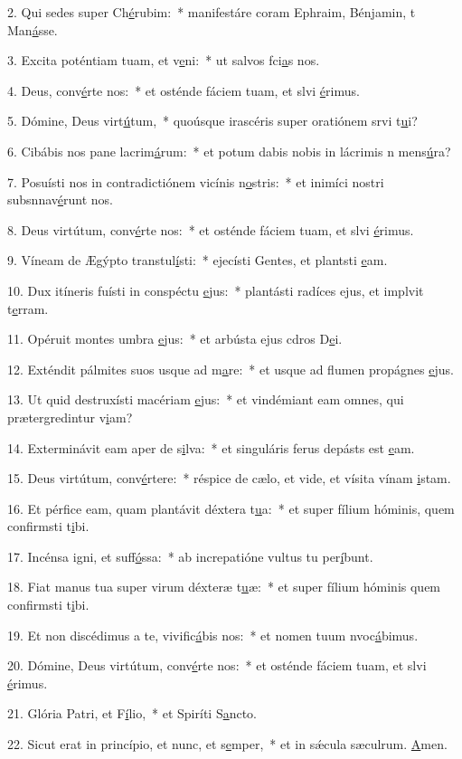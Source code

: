 2. Qui sedes super Ch\uline{é}rubim:~* manifestáre coram Ephraim, Bénjamin, t Man\uline{á}sse.\par 
3. Excita poténtiam tuam, et v\uline{e}ni:~* ut salvos fci\uline{a}s nos.\par 
4. Deus, conv\uline{é}rte nos:~* et osténde fáciem tuam, et slvi \uline{é}rimus.\par 
5. Dómine, Deus virt\uline{ú}tum,~* quoúsque irascéris super oratiónem srvi t\uline{u}i?\par 
6. Cibábis nos pane lacrim\uline{á}rum:~* et potum dabis nobis in lácrimis n mens\uline{ú}ra?\par 
7. Posuísti nos in contradictiónem vicínis n\uline{o}stris:~* et inimíci nostri subsnnav\uline{é}runt nos.\par 
8. Deus virtútum, conv\uline{é}rte nos:~* et osténde fáciem tuam, et slvi \uline{é}rimus.\par 
9. Víneam de Ægýpto transtul\uline{í}sti:~* ejecísti Gentes, et plantsti \uline{e}am.\par 
10. Dux itíneris fuísti in conspéctu \uline{e}jus:~* plantásti radíces ejus, et implvit t\uline{e}rram.\par 
11. Opéruit montes umbra \uline{e}jus:~* et arbústa ejus cdros D\uline{e}i.\par 
12. Exténdit pálmites suos usque ad m\uline{a}re:~* et usque ad flumen propágnes \uline{e}jus.\par 
13. Ut quid destruxísti macériam \uline{e}jus:~* et vindémiant eam omnes, qui prætergredintur v\uline{i}am?\par 
14. Exterminávit eam aper de s\uline{i}lva:~* et singuláris ferus depásts est \uline{e}am.\par 
15. Deus virtútum, conv\uline{é}rtere:~* réspice de cælo, et vide, et vísita vínam \uline{i}stam.\par 
16. Et pérfice eam, quam plantávit déxtera t\uline{u}a:~* et super fílium hóminis, quem confirmsti t\uline{i}bi.\par 
17. Incénsa igni, et suff\uline{ó}ssa:~* ab increpatióne vultus tu per\uline{í}bunt.\par 
18. Fiat manus tua super virum déxteræ t\uline{u}æ:~* et super fílium hóminis quem confirmsti t\uline{i}bi.\par 
19. Et non discédimus a te, vivific\uline{á}bis nos:~* et nomen tuum nvoc\uline{á}bimus.\par 
20. Dómine, Deus virtútum, conv\uline{é}rte nos:~* et osténde fáciem tuam, et slvi \uline{é}rimus.\par 
21. Glória Patri, et F\uline{í}lio,~* et Spiríti S\uline{a}ncto.\par 
22. Sicut erat in princípio, et nunc, et s\uline{e}mper,~* et in sǽcula sæculrum. \uline{A}men.\par 
